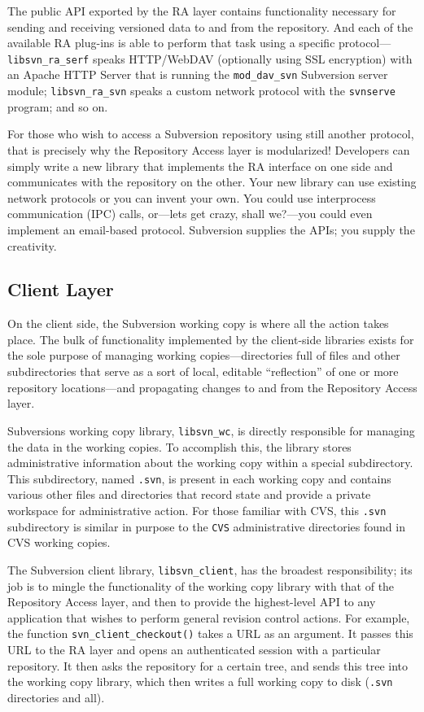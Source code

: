 The public API exported by the RA layer contains functionality necessary
for sending and receiving versioned data to and from the repository. And
each of the available RA plug-ins is able to perform that task using a
specific protocol---\texttt{libsvn\_ra\_serf} speaks HTTP/WebDAV
(optionally using SSL encryption) with an Apache HTTP Server that is
running the \texttt{mod\_dav\_svn} Subversion server module;
\texttt{libsvn\_ra\_svn} speaks a custom network protocol with the
\texttt{svnserve} program; and so on.

For those who wish to access a Subversion repository using still another
protocol, that is precisely why the Repository Access layer is
modularized! Developers can simply write a new library that implements
the RA interface on one side and communicates with the repository on the
other. Your new library can use existing network protocols or you can
invent your own. You could use interprocess communication (IPC) calls,
or---let\textquotesingle s get crazy, shall we?---you could even
implement an email-based protocol. Subversion supplies the APIs; you
supply the creativity.

\subsection{Client Layer}\label{svn.developer.layerlib.client}

On the client side, the Subversion working copy is where all the action
takes place. The bulk of functionality implemented by the client-side
libraries exists for the sole purpose of managing working
copies---directories full of files and other subdirectories that serve
as a sort of local, editable ``reflection'' of one or more repository
locations---and propagating changes to and from the Repository Access
layer.

Subversion\textquotesingle s working copy library, \texttt{libsvn\_wc},
is directly responsible for managing the data in the working copies. To
accomplish this, the library stores administrative information about the
working copy within a special subdirectory. This subdirectory, named
\texttt{.svn}, is present in each working copy and contains various
other files and directories that record state and provide a private
workspace for administrative action. For those familiar with CVS, this
\texttt{.svn} subdirectory is similar in purpose to the \texttt{CVS}
administrative directories found in CVS working copies.

The Subversion client library, \texttt{libsvn\_client}, has the broadest
responsibility; its job is to mingle the functionality of the working
copy library with that of the Repository Access layer, and then to
provide the highest-level API to any application that wishes to perform
general revision control actions. For example, the function
\texttt{svn\_client\_checkout()} takes a URL as an argument. It passes
this URL to the RA layer and opens an authenticated session with a
particular repository. It then asks the repository for a certain tree,
and sends this tree into the working copy library, which then writes a
full working copy to disk (\texttt{.svn} directories and all).

